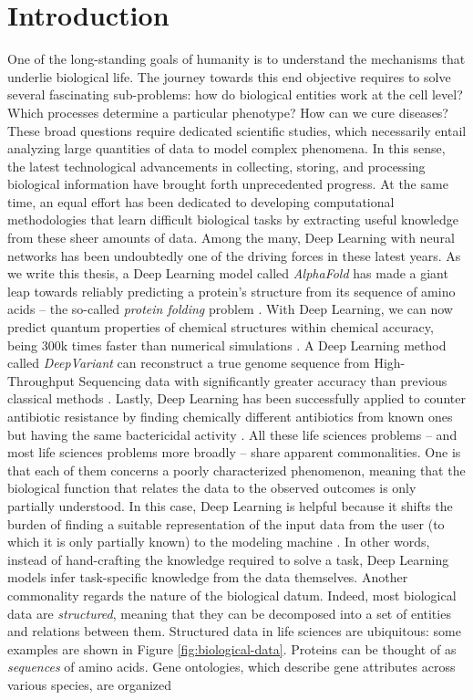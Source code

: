 
\chapter{Introduction}\label{ch:introduction}
One of the long-standing goals of humanity is to understand the mechanisms that underlie biological life. The journey towards this end objective requires to solve several fascinating sub-problems: how do biological entities work at the cell level? Which processes determine a particular phenotype? How can we cure diseases? These broad questions require dedicated scientific studies, which necessarily entail analyzing large quantities of data to model complex phenomena. In this sense, the latest technological advancements in collecting, storing, and processing biological information have brought forth unprecedented progress. At the same time, an equal effort has been dedicated to developing computational methodologies that learn difficult biological tasks by extracting useful knowledge from these sheer amounts of data. Among the many, Deep Learning with neural networks \citep{lecun2015naturedeeplearning} has been undoubtedly one of the driving forces in these latest years. As we write this thesis, a Deep Learning model called \emph{AlphaFold} has made a giant leap towards reliably predicting a protein's structure from its sequence of amino acids -- the so-called \emph{protein folding} problem \citep{senior2020alphafold}. With Deep Learning, we can now predict quantum properties of chemical structures within chemical accuracy, being 300k times faster than numerical simulations  \citep{gilmer2017neuralmessagepassing}. A Deep Learning method called \emph{DeepVariant} can reconstruct a true genome sequence from High-Throughput Sequencing data with significantly greater accuracy than previous classical methods \citep{poplin2018deepvariant}. Lastly, Deep Learning has been successfully applied to counter antibiotic resistance by finding chemically different antibiotics from known ones but having the same bactericidal activity \citep{stokes2020deeplearningantibiotic}. All these life sciences problems -- and most life sciences problems more broadly -- share apparent commonalities. One is that each of them concerns a poorly characterized phenomenon, meaning that the biological function that relates the data to the observed outcomes is only partially understood. In this case, Deep Learning is helpful because it shifts the burden of finding a suitable representation of the input data from the user (to which it is only partially known) to the modeling machine \citep{bengio2014representationlearning}. In other words, instead of hand-crafting the knowledge required to solve a task, Deep Learning models infer task-specific knowledge from the data themselves. Another commonality regards the nature of the biological datum. Indeed, most biological data are \emph{structured}, meaning that they can be decomposed into a set of entities and relations between them. Structured data in life sciences are ubiquitous: some examples are shown in Figure \ref{fig:biological-data}. Proteins can be thought of as \emph{sequences} of amino acids. Gene ontologies, which describe gene attributes across various species, are organized 